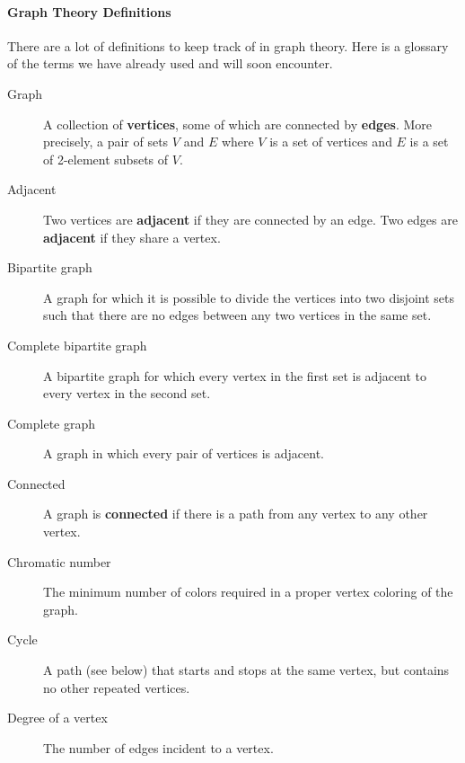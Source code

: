 \documentclass[11pt,]{book}
\newcommand{\terminology}[1]{\textbf{#1}}
\theoremstyle{ptxplainnotitle}
\theoremstyle{ptxplaintitle}
\theoremstyle{ptxdefinitionnotitle}
\theoremstyle{ptxdefinitiontitle}
\theoremstyle{ptxdefinitionnotitle}
\theoremstyle{ptxdefinitiontitle}
\theoremstyle{ptxdefinitionnotitle}
\theoremstyle{ptxdefinitiontitle}
\theoremstyle{ptxdefinitiontitlenonumber}
\theoremstyle{ptxdefinitiontitlenonumber}
\numberwithin{equation}{chapter}
\begin{document}
\paragraph[{Graph Theory Definitions}]{Graph Theory Definitions}\hypertarget{paragraphs-7}{}
\hypertarget{p-2763}{}%
There are a lot of definitions to keep track of in graph theory.  Here is a glossary of the terms we have already used and will soon encounter. \leavevmode%
\begin{description}
\item[{Graph}]\hypertarget{li-1339}{}\hypertarget{p-2764}{}%
 A collection of \terminology{vertices}, some of which are connected by \terminology{edges}. More precisely, a pair of sets \(V\) and \(E\) where \(V\) is a set of vertices and \(E\) is a set of 2-element subsets of \(V\).%
\item[{Adjacent}]\hypertarget{li-1340}{}\hypertarget{p-2765}{}%
 Two vertices are \terminology{adjacent} if they are connected by an edge. Two edges are \terminology{adjacent} if they share a vertex.%
\item[{Bipartite graph}]\hypertarget{li-1341}{}\hypertarget{p-2766}{}%
 A graph for which it is possible to divide the vertices into two disjoint sets such that there are no edges between any two vertices in the same set.%
\item[{Complete bipartite graph}]\hypertarget{li-1342}{}\hypertarget{p-2767}{}%
A bipartite graph for which every vertex in the first set is adjacent to every vertex in the second set.%
\item[{Complete graph}]\hypertarget{li-1343}{}\hypertarget{p-2768}{}%
 A graph in which every pair of vertices is adjacent.%
\item[{Connected}]\hypertarget{li-1344}{}\hypertarget{p-2769}{}%
 A graph is \terminology{connected} if there is a path from any vertex to any other vertex.%
\item[{Chromatic number}]\hypertarget{li-1345}{}\hypertarget{p-2770}{}%
 The minimum number of colors required in a proper vertex coloring of the graph.%
\item[{Cycle}]\hypertarget{li-1346}{}\hypertarget{p-2771}{}%
 A path (see below) that starts and stops at the same vertex, but contains no other repeated vertices.%
\item[{Degree of a vertex}]\hypertarget{li-1347}{}\hypertarget{p-2772}{}%
 The number of edges incident to a vertex.%

\end{description}
\end{document}
